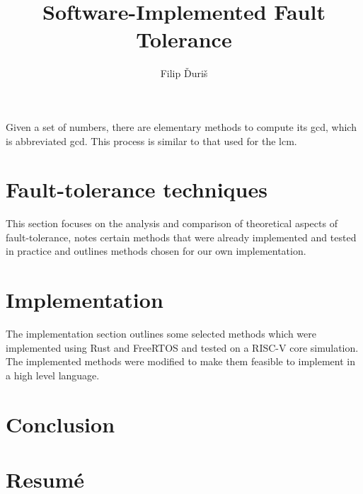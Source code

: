 \documentclass[12pt, letterpaper]{article}
\title{
    \Huge \textbf{Software-Implemented Fault Tolerance}
}
\author{Filip Ďuriš}
\begin{document}
% 


\newpage


\newpage





\tableofcontents
\newpage

Given a set of numbers, there are elementary methods to compute 
its \acrlong{gcd}, which is abbreviated \acrshort{gcd}. This process 
is similar to that used for the \acrfull{lcm}.

\glsaddall
\printglossary[type=\acronymtype]


\newpage




\newpage



\section{Fault-tolerance techniques}

This section focuses on the analysis and comparison of theoretical aspects of fault-tolerance, notes certain methods that were already implemented and tested in practice and outlines methods chosen for our own implementation.







\clearpage


\newpage


\clearpage

\clearpage
\section{Implementation}

The implementation section outlines some selected methods which were implemented using Rust and FreeRTOS and tested on a RISC-V core simulation. The implemented methods were modified to make them feasible to implement in a high level language.


\clearpage


\clearpage


\clearpage



\clearpage


\clearpage
\section{Conclusion}


\clearpage
\section{Resumé}

\newpage
\printbibliography
\end{document}
